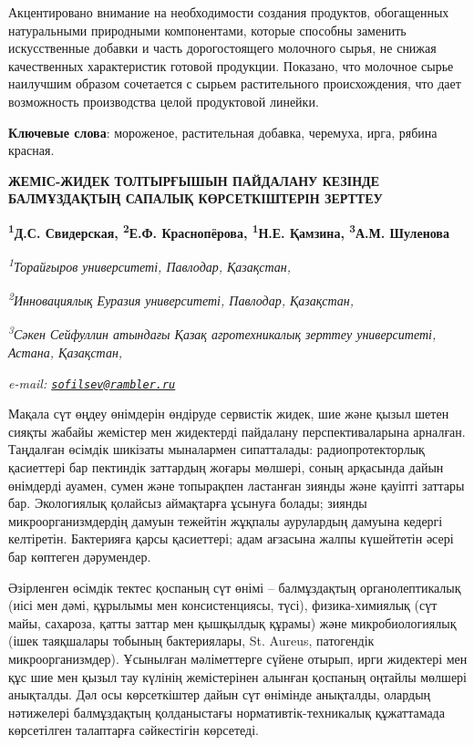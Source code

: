 Акцентировано внимание на необходимости создания продуктов, обогащенных
натуральными природными компонентами, которые способны заменить
искусственные добавки и часть дорогостоящего молочного сырья, не снижая
качественных характеристик готовой продукции. Показано, что молочное
сырье наилучшим образом сочетается с сырьем растительного происхождения,
что дает возможность производства целой продуктовой линейки.

{\bfseries Ключевые слова}: мороженое, растительная добавка, черемуха,
ирга, рябина красная.

\begin{articleheader}
{\bfseries ЖЕМІС-ЖИДЕК ТОЛТЫРҒЫШЫН ПАЙДАЛАНУ КЕЗІНДЕ БАЛМҰЗДАҚТЫҢ САПАЛЫҚ КӨРСЕТКІШТЕРІН ЗЕРТТЕУ}

{\bfseries
\textsuperscript{1}Д.С. Свидерская\textsuperscript{\envelope },
\textsuperscript{2}Е.Ф. Краснопёрова,
\textsuperscript{1}Н.Е. Қамзина,
\textsuperscript{3}А.М. Шуленова}
\end{articleheader}

\begin{affiliation}
\emph{\textsuperscript{1}Торайғыров университеті, Павлодар, Қазақстан,}

\emph{\textsuperscript{2}Инновациялық Еуразия университеті, Павлодар, Қазақстан,}

\emph{\textsuperscript{3}Сәкен Сейфуллин атындағы Қазақ агротехникалық зерттеу университеті, Астана, Қазақстан,}

\emph{e-mail: \href{mailto:sofilsev@rambler.ru}{\nolinkurl{sofilsev@rambler.ru}}}
\end{affiliation}

Мақала сүт өңдеу өнімдерін өндіруде сервистік жидек, шие және қызыл
шетен сияқты жабайы жемістер мен жидектерді пайдалану перспективаларына
арналған. Таңдалған өсімдік шикізаты мыналармен сипатталады:
радиопротекторлық қасиеттері бар пектиндік заттардың жоғары мөлшері,
соның арқасында дайын өнімдерді ауамен, сумен және топырақпен ластанған
зиянды және қауіпті заттары бар. Экологиялық қолайсыз аймақтарға ұсынуға
болады; зиянды микроорганизмдердің дамуын тежейтін жұқпалы аурулардың
дамуына кедергі келтіретін. Бактерияға қарсы қасиеттері; адам ағзасына
жалпы күшейтетін әсері бар көптеген дәрумендер.

Әзірленген өсімдік тектес қоспаның сүт өнімі -- балмұздақтың
органолептикалық (иісі мен дәмі, құрылымы мен консистенциясы, түсі),
физика-химиялық (сүт майы, сахароза, қатты заттар мен қышқылдық құрамы)
және микробиологиялық (ішек таяқшалары тобының бактериялары, St. Aureus,
патогендік микроорганизмдер). Ұсынылған мәліметтерге сүйене отырып, ирги
жидектері мен құс шие мен қызыл тау күлінің жемістерінен алынған
қоспаның оңтайлы мөлшері анықталды. Дәл осы көрсеткіштер дайын сүт
өнімінде анықталды, олардың нәтижелері балмұздақтың қолданыстағы
нормативтік-техникалық құжаттамада көрсетілген талаптарға сәйкестігін
көрсетеді.

